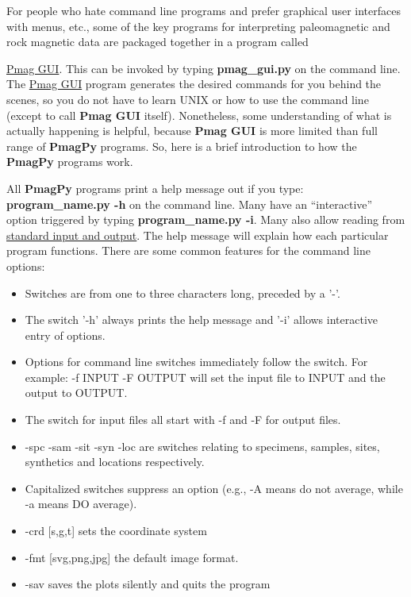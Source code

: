 \documentclass[11pt]{book}
\begin{document}
{For people who hate command line programs and prefer graphical user interfaces with menus, etc., some of the key programs for interpreting paleomagnetic and rock magnetic data are packaged together in a program called {\href{#pmag_gui.py}{Pmag GUI}.  This can be invoked by typing {\bf pmag\_gui.py} on the command line.
The \href{#pmag_gui.py}{Pmag GUI} program generates the desired commands for you behind the scenes, so you do not have to learn UNIX or how to use the command line (except to call {\bf Pmag GUI} itself).  Nonetheless, some understanding of what is actually happening is helpful, because {\bf Pmag GUI} is more limited than  full range of {\bf PmagPy} programs.  So, here is a brief introduction to how the {\bf PmagPy} programs work.

All {\bf PmagPy} programs print a help message out if you type: {\bf program\_name.py -h} on the command line.  Many have an ``interactive'' option triggered by typing {\bf program\_name.py -i}.  Many also allow reading from \href{#standard_IO }{standard input and output}.   The help message will explain how each particular program functions.  There are some common features for the command line options:


\begin{itemize}
\item Switches are from one to three characters long, preceded by a '-'.
\item The switch '-h' always prints the help message and '-i' allows interactive entry of options.
\item  Options for command line switches immediately follow the switch.  For example:  -f INPUT -F OUTPUT will set the input file to INPUT and the output to OUTPUT.
\item  The switch for input  files all start with -f and -F for output files.
\item -spc -sam -sit -syn  -loc are switches relating to specimens, samples, sites, synthetics and locations respectively.
\item Capitalized switches suppress an option (e.g., -A means do not average, while -a means DO average).
\item -crd [s,g,t] sets the coordinate system
\item -fmt [svg,png,jpg] the default image format.
\item -sav  saves the plots silently and quits the program
\end{itemize}
\newcommand{\stt}{\small\tt}
\newcount\exnum
\outer{}

}}
\end{document}
